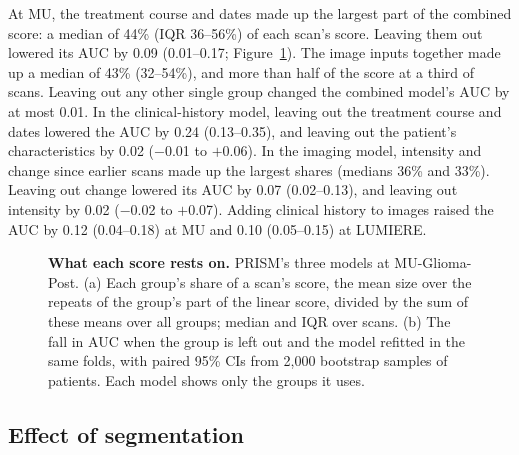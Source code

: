 \documentclass[largeformat]{interact} %
\begin{document}
At MU, the treatment course and dates made up the largest part of the combined score: a median of 44\% (IQR 36--56\%)
of each scan's score. Leaving them out lowered its AUC by 0.09 (0.01--0.17; Figure~\ref{fig:3}). The image inputs
together made up a median of 43\% (32--54\%), and more than half of the score at a third of scans. Leaving out any
other single group changed the combined model's AUC by at most 0.01. In the clinical-history model, leaving out the
treatment course and dates lowered the AUC by 0.24 (0.13--0.35), and leaving out the patient's characteristics by
0.02 ($-$0.01 to $+$0.06). In the imaging model, intensity and change since earlier scans made up the largest shares
(medians 36\% and 33\%). Leaving out change lowered its AUC by 0.07 (0.02--0.13), and leaving out intensity by 0.02
($-$0.02 to $+$0.07). Adding clinical history to images raised the AUC by 0.12 (0.04--0.18) at MU and 0.10 (0.05--0.15) at LUMIERE.


\begin{figure}[!htbp]
\centering
{}
\caption{\textbf{What each score rests on.} PRISM's three models at MU-Glioma-Post. (a) Each group's share of a scan's score, the mean size over the repeats of the group's part of
the linear score, divided by the sum of these means over all groups; median and IQR over scans. (b) The
fall in AUC when the group is left out and the model refitted in the same folds, with paired 95\% CIs from 2,000
bootstrap samples of patients. Each model shows only the groups it uses.}
\label{fig:3}
\end{figure}

\subsection{Effect of segmentation}\label{sec:3.3}
\end{document}
